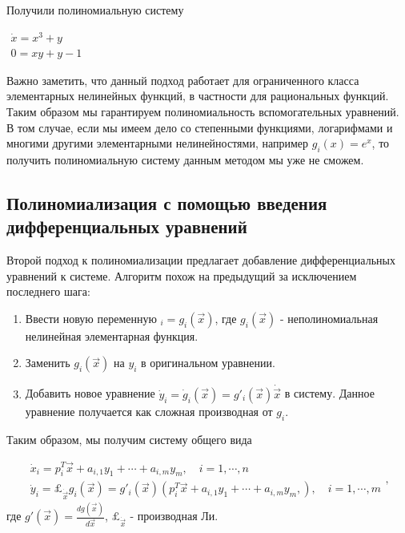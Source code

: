 Получили полиномиальную систему

$\begin{array}{lcl}
    \dot x = x^3 + y \\
    0 = xy + y - 1
\end{array}$
\newline

\begin{remark}
Важно заметить, что данный подход работает для ограниченного класса элементарных нелинейных функций, в частности для рациональных функций. Таким образом мы гарантируем полиномиальность вспомогательных уравнений. В том случае, если мы имеем дело со степенными функциями, логарифмами и многими другими элементарными нелинейностями, например $g_i(x) = e^x$, то получить полиномиальную систему данным методом мы уже не сможем.
\end{remark}


\subsection{Полиномиализация с помощью введения дифференциальных уравнений} \label{sec:poly-diff}

Второй подход к полиномиализации предлагает добавление дифференциальных уравнений к системе.
Алгоритм похож на предыдущий за исключением последнего шага:

\begin{enumerate}
    \item Ввести новую переменную $_i = g_i(\vec x)$, где $g_i(\vec x)$ - неполиномиальная нелинейная элементарная функция.
    \item Заменить $g_i(\vec x)$ на $y_i$ в оригинальном уравнении.
    \item Добавить новое уравнение $\dot y_i = \dot g_i(\vec x) = g'_i(\vec x) \dot {\vec x}$ в систему. Данное уравнение получается как сложная производная от $g_i$.
\end{enumerate}

Таким образом, мы получим систему общего вида

\begin{equation}
    \begin{array}{lcl}
        \dot x_i = p_i^T \vec x + a_{i,1} y_1 + \cdots + a_{i,m} y_m,\quad i = 1, \cdots, n \\
        \dot y_i = \pounds_{\dot{\vec x}} g_i(\vec x) = g'_i(\vec x)(p_i^T \vec x + a_{i,1} y_1 + \cdots + a_{i,m} y_m,),\quad i = 1, \cdots, m
    \end{array},
\end{equation}
\newline
где $g'(\vec x) = \frac {dg(\vec x)}{d \vec x}$, $\pounds_{\dot{\vec x}}$ - производная Ли.

